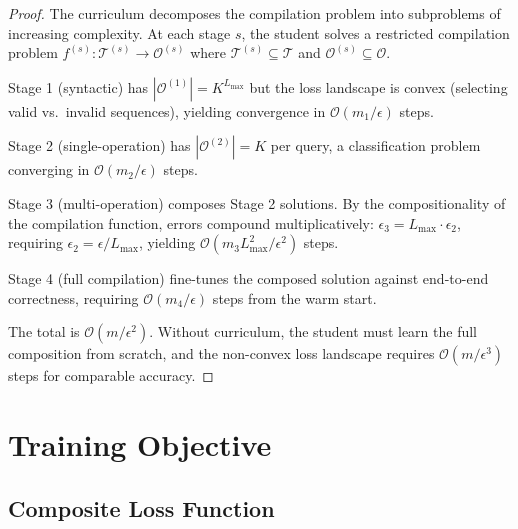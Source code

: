 \documentclass[11pt,twocolumn,a4paper]{article}
\theoremstyle{definition}
\theoremstyle{remark}
\newcommand{\taskspace}{\mathcal{T}}
\newcommand{\opspace}{\mathcal{O}}
\begin{document}
\begin{proof}
The curriculum decomposes the compilation problem into subproblems of increasing complexity. At each stage $s$, the student solves a restricted compilation problem $f^{(s)}: \taskspace^{(s)} \to \opspace^{(s)}$ where $\taskspace^{(s)} \subseteq \taskspace$ and $\opspace^{(s)} \subseteq \opspace$.

Stage 1 (syntactic) has $|\opspace^{(1)}| = K^{L_{\max}}$ but the loss landscape is convex (selecting valid vs.\ invalid sequences), yielding convergence in $\mathcal{O}(m_1 / \epsilon)$ steps.

Stage 2 (single-operation) has $|\opspace^{(2)}| = K$ per query, a classification problem converging in $\mathcal{O}(m_2 / \epsilon)$ steps.

Stage 3 (multi-operation) composes Stage 2 solutions. By the compositionality of the compilation function, errors compound multiplicatively: $\epsilon_3 = L_{\max} \cdot \epsilon_2$, requiring $\epsilon_2 = \epsilon / L_{\max}$, yielding $\mathcal{O}(m_3 L_{\max}^2 / \epsilon^2)$ steps.

Stage 4 (full compilation) fine-tunes the composed solution against end-to-end correctness, requiring $\mathcal{O}(m_4 / \epsilon)$ steps from the warm start.

The total is $\mathcal{O}(m / \epsilon^2)$. Without curriculum, the student must learn the full composition from scratch, and the non-convex loss landscape requires $\mathcal{O}(m / \epsilon^3)$ steps for comparable accuracy.
\end{proof}

\section{Training Objective}
\label{sec:training_objective}

\subsection{Composite Loss Function}
\end{document}
